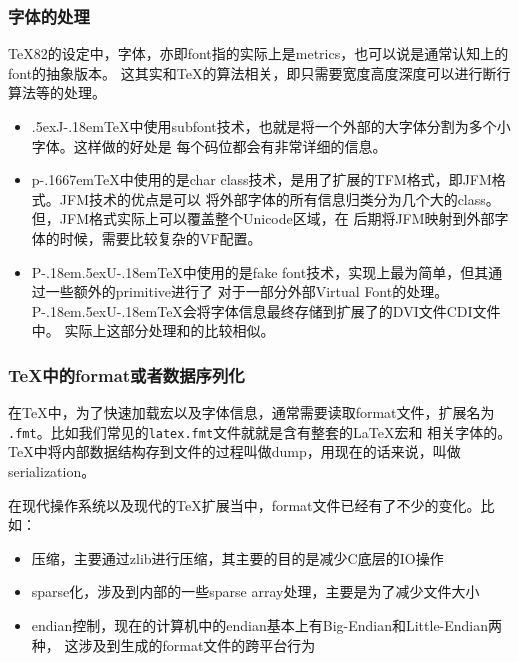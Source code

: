 \documentclass[dvipdfmx]{beamer}
\newcommand{\pTeX}{p\kern-.1667em\TeX}
\newcommand{\JTeX}{\leavevmode\hbox{\lower.5ex\hbox{J}\kern-.18em\TeX}}
\newcommand{\PUTeX}{\leavevmode\hbox{P\kern-.18em\lower.5ex\hbox{U}\kern-.18em\TeX}}
\begin{document}
%
\begin{frame}[fragile]
\frametitle{字体的处理}
\TeX82的设定中，字体，亦即font指的实际上是metrics，也可以说是通常认知上的font的抽象版本。
这其实和\TeX 的算法相关，即只需要宽度高度深度可以进行断行算法等的处理。
\begin{itemize}
\item \JTeX 中使用subfont技术，也就是将一个外部的大字体分割为多个小字体。这样做的好处是
每个码位都会有非常详细的信息。
\item \pTeX 中使用的是char class技术，是用了扩展的TFM格式，即JFM格式。JFM技术的优点是可以
将外部字体的所有信息归类分为几个大的class。但，JFM格式实际上可以覆盖整个Unicode区域，在
后期将JFM映射到外部字体的时候，需要比较复杂的VF配置。
\item \PUTeX 中使用的是fake font技术，实现上最为简单，但其通过一些额外的primitive进行了
对于一部分外部Virtual Font的处理。\PUTeX 会将字体信息最终存储到扩展了的DVI文件CDI文件中。
实际上这部分处理和的比较相似。

\end{itemize}
\end{frame}
%
\begin{frame}[fragile]
\frametitle{\TeX 中的format或者数据序列化}
在\TeX 中，为了快速加载宏以及字体信息，通常需要读取format文件，扩展名为
\texttt{.fmt}。比如我们常见的\texttt{latex.fmt}文件就就是含有整套的\LaTeX 宏和
相关字体的。\TeX 中将内部数据结构存到文件的过程叫做dump，用现在的话来说，叫做
serialization。

在现代操作系统以及现代的\TeX 扩展当中，format文件已经有了不少的变化。比如：
\begin{itemize}
\item 压缩，主要通过zlib进行压缩，其主要的目的是减少C底层的IO操作
\item sparse化，涉及到内部的一些sparse array处理，主要是为了减少文件大小
\item endian控制，现在的计算机中的endian基本上有Big-Endian和Little-Endian两种，
这涉及到生成的format文件的跨平台行为
\end{itemize}
\end{frame}
%
\end{document}
